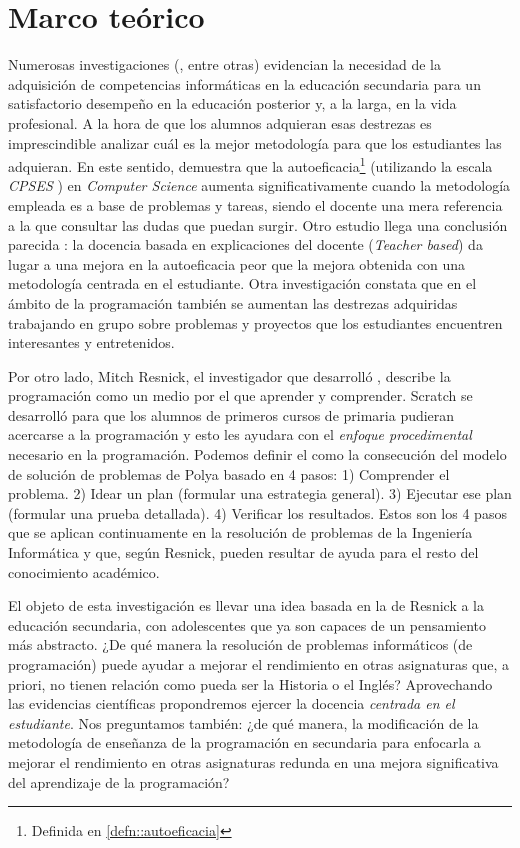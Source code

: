 \documentclass[palatino,miniheader]{apuntesURJC}
\newcommand{\CPSES}{\textit{\gls{CPSES}} \cite{CPSES}}
\begin{document}
\chapter{Marco teórico}

Numerosas investigaciones (\cite{CSIsImportant},\cite{CSArguing} entre otras) evidencian la necesidad de la adquisición de competencias informáticas en la educación secundaria para un satisfactorio desempeño en la educación posterior y, a la larga, en la vida profesional.
%
A la hora de que los alumnos adquieran esas destrezas es imprescindible analizar cuál es la mejor metodología para que los estudiantes las adquieran.
%
En este sentido, \cite{StudentCenter} demuestra que la autoeficacia\footnote{Definida en \ref{defn::autoeficacia}} (utilizando la escala \CPSES) en \textit{Computer Science} aumenta significativamente cuando la metodología empleada es a base de problemas y tareas, siendo el docente una mera referencia a la que consultar las dudas que puedan surgir.
%
\label{studentbased}
%
Otro estudio llega una conclusión parecida \cite{StudentCenterVSLectures}:
%
la docencia basada en explicaciones del docente (\textit{Teacher based}) da lugar a una mejora en la autoeficacia peor que la mejora obtenida con una metodología centrada en el estudiante.
%
\label{groupsbased}
%
Otra investigación \cite{ABPCS} constata que en el ámbito de la programación también se aumentan las destrezas adquiridas trabajando en grupo sobre problemas y proyectos que los estudiantes encuentren interesantes y entretenidos. 


Por otro lado, Mitch Resnick, el investigador que desarrolló  \cite{scratch}, describe la programación como un medio por el que aprender y comprender.
%
Scratch se desarrolló para que los alumnos de primeros cursos de primaria pudieran acercarse a la programación y esto les ayudara con el \textit{enfoque procedimental} necesario en la programación.
%
Podemos definir el  como la consecución del modelo de solución de problemas de Polya \cite{Polya} basado en 4 pasos:
1) Comprender el problema. 2) Idear un plan (formular una estrategia general). 3) Ejecutar ese plan (formular una prueba detallada). 4) Verificar los resultados. 
%
Estos son los 4 pasos que se aplican continuamente en la resolución de problemas de la Ingeniería Informática y que, según Resnick, pueden resultar de ayuda para el resto del conocimiento académico.

El objeto de esta investigación es llevar una idea basada en la de Resnick a la educación secundaria, con adolescentes que ya son capaces de un pensamiento más abstracto.
%
¿De qué manera la resolución de problemas informáticos (de programación) puede ayudar a mejorar el rendimiento en otras asignaturas que, a priori, no tienen relación como pueda ser la Historia o el Inglés?
%
Aprovechando las evidencias científicas propondremos ejercer la docencia \textit{centrada en el estudiante}.
%
Nos preguntamos también:
%
¿de qué manera, la modificación de la metodología de enseñanza de la programación en secundaria para enfocarla a mejorar el rendimiento en otras asignaturas redunda en una mejora significativa del aprendizaje de la programación?
\end{document}

